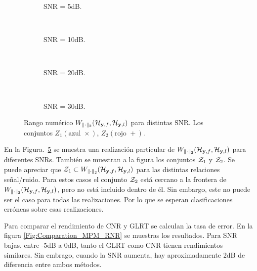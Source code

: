 			\begin{figure}[t]
				\centering
				\begin{subfigure}[t]{0.23\textwidth}
					\centering
					\resizebox{\linewidth}{!}{}
					\caption{ SNR = 5dB.}
					\label{Fig:A1_B1_5dB} 
				\end{subfigure}
				~
				\begin{subfigure}[t]{0.23\textwidth}
					\centering
					\resizebox{\linewidth}{!}{}
					\caption{SNR = 10dB.}
					\label{Fig:A1_B1_10dB} 
				\end{subfigure}
				~				
				\begin{subfigure}[t]{0.23\textwidth}
					\centering
					\resizebox{\linewidth}{!}{}
					\caption{SNR = 20dB.}
					\label{Fig:A1_B1_20dB} 
				\end{subfigure}
				~
				\begin{subfigure}[t]{0.23\textwidth}
					\centering
					\resizebox{\linewidth}{!}{}	
					\caption{SNR = 30dB.}
					\label{Fig:A1_B1_30dB} 
				\end{subfigure}
				\caption{Rango numérico $W_{\|\cdot\|_2}(\mathcal{H}_{\mathbf{y},f},\mathcal{H}_{\mathbf{y},l})$ para distintas SNR. Los conjuntos $Z_1 (\text{azul }\times)$, $Z_2(\text{rojo }+)$.}
				\label{Fig:A1_B1}
			\end{figure}
			
			En la Figura.~\ref{Fig:A1_B1} se muestra una realización particular de $W_{\|\cdot\|_2}(\mathcal{H}_{\mathbf{y},f},\mathcal{H}_{\mathbf{y},l})$ para diferentes SNRs. También se muestran a la figura los conjuntos $\mathcal{Z}_1$ y $\mathcal{Z}_2$. Se puede apreciar que $\mathcal{Z}_1\subset W_{\|\cdot\|_2}(\mathcal{H}_{\mathbf{y},f},\mathcal{H}_{\mathbf{y},l})$ para las distintas relaciones señal/ruido. Para estos casos el conjunto $\mathcal{Z}_2$ está cercano a la frontera de $W_{\|\cdot\|_2}(\mathcal{H}_{\mathbf{y},f},\mathcal{H}_{\mathbf{y},l})$, pero no está incluido dentro de él. Sin embargo, este no puede ser el caso para todas las realizaciones. Por lo que se esperan clasificaciones erróneas sobre esas realizaciones.
			
			Para comparar el rendimiento de CNR y GLRT se calculan la tasa de error. En la figura \ref{Fig:Comparation_MPM_RNR} se muestras los resultados. Para SNR bajas, entre -5dB a 0dB, tanto el GLRT como CNR tienen rendimientos similares. Sin embrago, cuando la SNR aumenta, hay aproximadamente 2dB de diferencia entre ambos métodos.
			
